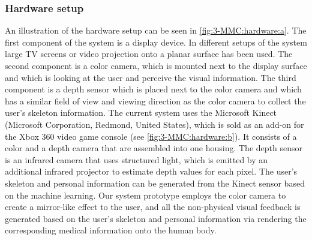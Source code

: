 \subsubsection{Hardware setup}
An illustration of the hardware setup can be seen in \figurename{ \ref{fig:3-MMC:hardware:a}}. The first component of the system is a display device. In different setups of the system large TV screens or video projection onto a planar surface has been used. The second component is a color camera, which is mounted next to the display surface and which is looking at the user and perceive the visual information. The third component is a depth sensor which is placed next to the color camera and which has a similar field of view and viewing direction as the color camera to collect the user's skeleton information. 
The current system uses the Microsoft Kinect (Microsoft Corporation, Redmond, United States), which is sold as an add-on for the Xbox 360 video game console (see \figurename{ \ref{fig:3-MMC:hardware:b}}).
It consists of a color and a depth camera that are assembled into one housing. The depth sensor is an infrared camera that uses structured light, which is emitted by an additional infrared projector to estimate depth values for each pixel. The user's skeleton and personal information can be generated from the Kinect sensor based on the machine learning.
Our system prototype employs the color camera to create a mirror-like effect to the user, and all the non-physical visual feedback is generated based on the user's skeleton and personal information via rendering the corresponding medical information onto the human body.

